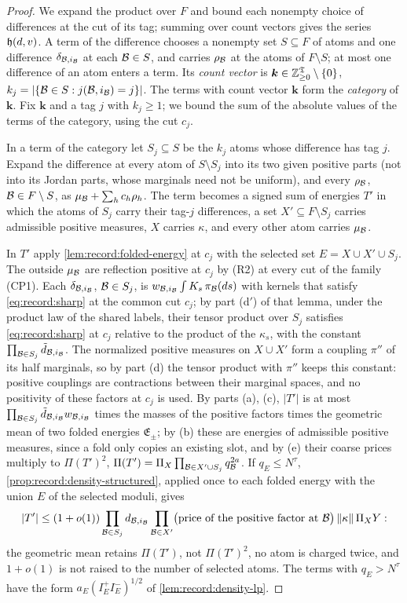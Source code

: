 \begin{proof}
We expand the product over $F$ and bound each nonempty choice of
differences at the cut of its tag; summing over count vectors gives
the series $\mathfrak h(d,v)$. A term of the difference chooses a
nonempty set
$S\subseteq F$ of atoms and one difference $\delta_{\mathcal B,i_\mathcal B}$ at each
$\mathcal B\in S$, and carries $\rho_\mathcal B$ at the atoms of $F\setminus S$; at most
one difference of an atom enters a term. Its \emph{count vector} is
$\boldsymbol k\in\mathbb Z_{\ge0}^{\mathfrak T}\setminus\{0\}$,
$k_j=|\{\mathcal B\in S:j(\mathcal B,i_\mathcal B)=j\}|$. The terms with count vector
$\boldsymbol k$ form the \emph{category} of $\boldsymbol k$. Fix
$\boldsymbol k$ and a tag $j$ with $k_j\ge1$; we bound the sum of the
absolute values of the terms of the category, using the cut $c_j$.

In a term of the category let $S_j\subseteq S$ be the $k_j$ atoms whose
difference has tag $j$. Expand the difference at every atom of
$S\setminus S_j$ into its two given positive parts (not into its Jordan
parts, whose marginals need not be uniform), and every $\rho_\mathcal B$,
$\mathcal B\in F\setminus S$, as $\mu_\mathcal B+\sum_hc_h\rho_h$. The term becomes a
signed sum of energies $T'$ in which the atoms of $S_j$ carry their tag-$j$
differences, a set $X'\subseteq F\setminus S_j$ carries admissible positive
measures, $X$ carries $\kappa$, and every other atom carries $\mu_\mathcal B$.

In $T'$ apply \cref{lem:record:folded-energy} at $c_j$ with the selected set
$E=X\cup X'\cup S_j$. The outside $\mu_\mathcal B$ are reflection positive at $c_j$
by (R2) at every cut of the family (CP1). Each $\delta_{\mathcal B,i_\mathcal B}$,
$\mathcal B\in S_j$, is $w_{\mathcal B,i_\mathcal B}\int K_s\,\pi_\mathcal B(ds)$ with kernels that
satisfy \eqref{eq:record:sharp} at the common cut $c_j$; by part (d$'$) of
that lemma, under the product law of the shared labels, their tensor product
over $S_j$ satisfies \eqref{eq:record:sharp} at $c_j$ relative to the
product of the $\kappa_s$, with the constant
$\prod_{\mathcal B\in S_j}\tilde d_{\mathcal B,i_\mathcal B}$. The normalized positive measures on
$X\cup X'$ form a coupling $\pi''$ of its half marginals, so by part (d) the
tensor product with $\pi''$ keeps this constant: positive couplings are
contractions between their marginal spaces, and no positivity of these
factors at $c_j$ is used. By parts (a), (c), $|T'|$ is at most
$\prod_{\mathcal B\in S_j}\tilde d_{\mathcal B,i_\mathcal B}w_{\mathcal B,i_\mathcal B}$ times the masses of the
positive factors times the geometric mean of two folded energies
$\mathfrak E_\pm$; by (b) these are energies of admissible positive measures,
since a fold only copies an existing slot, and by (e) their coarse prices
multiply to $\Pi(T')^2$, $\Pi(T')=\Pi_X\prod_{\mathcal B\in X'\cup S_j}q_\mathcal B^{2a}$.
If $q_E\le N^\tau$, \cref{prop:record:density-structured}, applied once to
each folded energy with the union $E$ of the selected moduli, gives
\[
 |T'|\le(1+o(1))\prod_{\mathcal B\in S_j}d_{\mathcal B,i_\mathcal B}\prod_{\mathcal B\in X'}
 \bigl(\text{price of the positive factor at }\mathcal B\bigr)\,\|\kappa\|\,\Pi_XY :
\]
the geometric mean retains $\Pi(T')$, not $\Pi(T')^2$, no atom is charged
twice, and $1+o(1)$ is not raised to the number of selected atoms. The terms
with $q_E>N^\tau$ have the form $a_E(I^+_EI^-_E)^{1/2}$ of
\cref{lem:record:density-lp}.


\end{proof}
